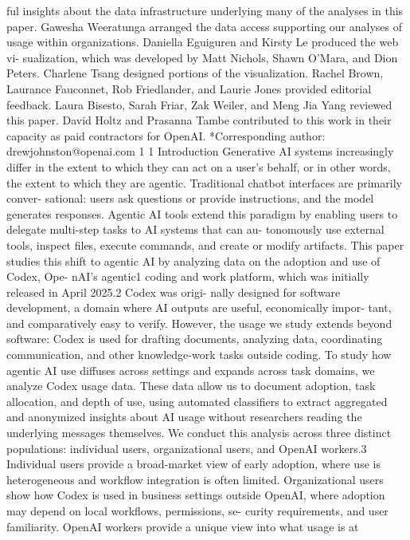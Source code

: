 ful insights about the data infrastructure underlying many of the analyses in this paper. Gawesha Weeratunga arranged the
data access supporting our analyses of usage within organizations. Daniella Eguiguren and Kirsty Le produced the web vi-
sualization, which was developed by Matt Nichols, Shawn O’Mara, and Dion Peters. Charlene Tsang designed portions of
the visualization. Rachel Brown, Laurance Fauconnet, Rob Friedlander, and Laurie Jones provided editorial feedback. Laura
Bisesto, Sarah Friar, Zak Weiler, and Meng Jia Yang reviewed this paper. David Holtz and Prasanna Tambe contributed to this
work in their capacity as paid contractors for OpenAI.
*Corresponding author: drewjohnston@openai.com
1
1
Introduction
Generative AI systems increasingly differ in the extent to which they can act on a user’s behalf, or in
other words, the extent to which they are agentic. Traditional chatbot interfaces are primarily conver-
sational: users ask questions or provide instructions, and the model generates responses. Agentic AI
tools extend this paradigm by enabling users to delegate multi-step tasks to AI systems that can au-
tonomously use external tools, inspect files, execute commands, and create or modify artifacts.
This paper studies this shift to agentic AI by analyzing data on the adoption and use of Codex, Ope-
nAI’s agentic1 coding and work platform, which was initially released in April 2025.2 Codex was origi-
nally designed for software development, a domain where AI outputs are useful, economically impor-
tant, and comparatively easy to verify. However, the usage we study extends beyond software: Codex is
used for drafting documents, analyzing data, coordinating communication, and other knowledge-work
tasks outside coding.
To study how agentic AI use diffuses across settings and expands across task domains, we analyze
Codex usage data. These data allow us to document adoption, task allocation, and depth of use, using
automated classifiers to extract aggregated and anonymized insights about AI usage without researchers
reading the underlying messages themselves.
We conduct this analysis across three distinct populations: individual users, organizational users,
and OpenAI workers.3 Individual users provide a broad-market view of early adoption, where use is
heterogeneous and workflow integration is often limited. Organizational users show how Codex is used
in business settings outside OpenAI, where adoption may depend on local workflows, permissions, se-
curity requirements, and user familiarity. OpenAI workers provide a unique view into what usage is at
